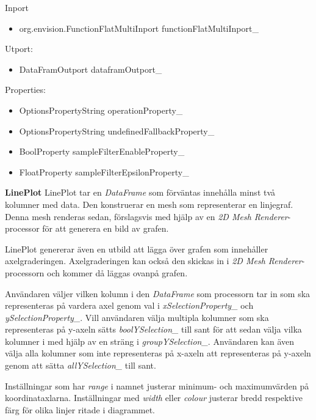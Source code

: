 \documentclass[10pt,oneside,swedish]{article}
\providecommand{\tightlist}{%
  \setlength{\itemsep}{0pt}\setlength{\parskip}{0pt}}
\begin{document}
Inport

\begin{itemize}
\tightlist
\item
  org.envision.FunctionFlatMultiInport functionFlatMultiInport\_
\end{itemize}

Utport:

\begin{itemize}
\tightlist
\item
  DataFramOutport dataframOutport\_
\end{itemize}

Properties:

\begin{itemize}
\tightlist
\item
  OptionsPropertyString operationProperty\_
\item
  OptionsPropertyString undefinedFallbackProperty\_
\item
  BoolProperty sampleFilterEnableProperty\_
\item
  FloatProperty sampleFilterEpsilonProperty\_
\end{itemize}

\textbf{LinePlot} LinePlot tar en \emph{DataFrame} som förväntas
innehålla minst två kolumner med data. Den konstruerar en mesh som
representerar en linjegraf. Denna mesh renderas sedan, förslagsvis med
hjälp av en \emph{2D Mesh Renderer}-processor för att generera en bild
av grafen.

LinePlot genererar även en utbild att lägga över grafen som innehåller
axelgraderingen. Axelgraderingen kan också den skickas in i \emph{2D
Mesh Renderer}-processorn och kommer då läggas ovanpå grafen.

Användaren väljer vilken kolumn i den \emph{DataFrame} som processorn
tar in som ska representeras på vardera axel genom val i
\emph{xSelectionProperty\_} och \emph{ySelectionProperty\_}. Vill
användaren välja multipla kolumner som ska representeras på y-axeln
sätts \emph{boolYSelection\_} till sant för att sedan välja vilka
kolumner i med hjälp av en sträng i \emph{groupYSelection\_}. Användaren
kan även välja alla kolumner som inte representeras på x-axeln att
representeras på y-axeln genom att sätta \emph{allYSelection\_} till
sant.

Inställningar som har \emph{range} i namnet justerar minimum- och
maximumvärden på koordinataxlarna. Inställningar med \emph{width} eller
\emph{colour} justerar bredd respektive färg för olika linjer ritade i
diagrammet.
\end{document}
